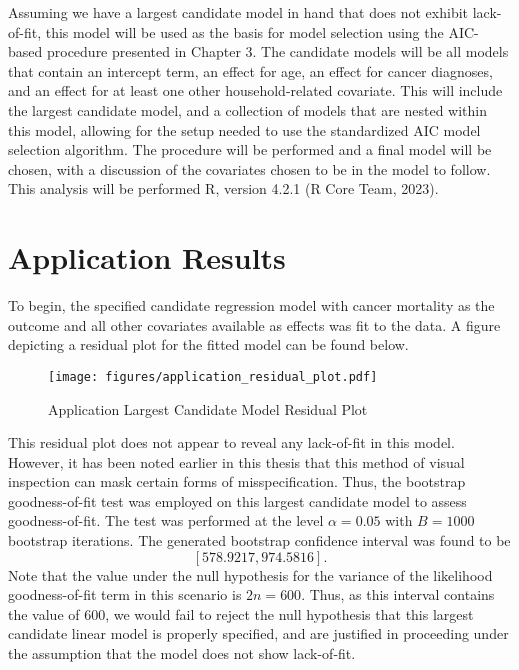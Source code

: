 		Assuming we have a largest candidate model in hand that does not exhibit lack-of-fit, this model will be used as the basis for model selection using the
		AIC-based procedure presented in Chapter 3. The candidate models will be all models that contain an intercept term, an effect for age, an effect for cancer
		diagnoses, and an effect for at least one other household-related covariate. This will include the largest candidate model, and a collection of models that
		are nested within this model, allowing for the setup needed to use the standardized AIC model selection algorithm. The procedure will be performed and a final model
		will be chosen, with a discussion of the covariates chosen to be in the model to follow. This analysis will be performed R, version 4.2.1 (R Core Team, 2023).
		
		\section{Application Results} \label{sec:app_res}

		To begin, the specified candidate regression model with cancer mortality as the outcome and all other covariates available as effects was fit to the data. A
		figure depicting a residual plot for the fitted model can be found below.

		\begin{figure}[H]
			\centering
			\captionsetup{justification=centering}
			\texttt{[image: figures/application\_residual\_plot.pdf]}
			\caption{\label{fig:app_residual_plot} Application Largest Candidate Model Residual Plot}
		\end{figure}

		This residual plot does not appear to reveal any lack-of-fit in this model. However, it has been noted earlier in this thesis that this method of visual
		inspection can mask certain forms of misspecification. Thus, the bootstrap goodness-of-fit test was employed on this largest candidate model to assess
		goodness-of-fit. The test was performed at the level $\alpha = 0.05$ with $B = 1000$ bootstrap iterations. The generated bootstrap confidence interval
		was found to be
		\begin{equation}
			\left[ 578.9217, 974.5816 \right].
		\end{equation}
		Note that the value under the null hypothesis for the variance of the likelihood goodness-of-fit term in this scenario is $2n = 600$. Thus, as this interval contains the
		value of $600$, we would fail to reject the null hypothesis that this largest candidate linear model is properly specified, and are justified in proceeding
		under the assumption that the model does not show lack-of-fit.

